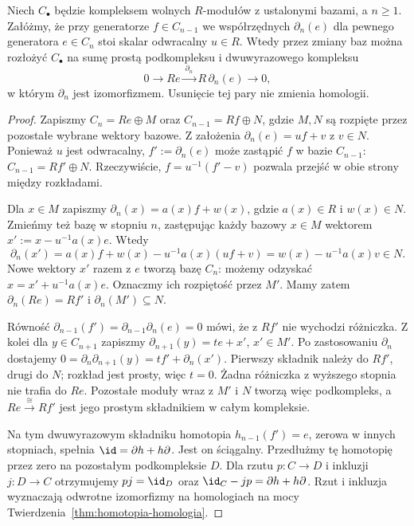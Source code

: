 \begin{twierdzenie}
\label{thm:kasowanie-pary}
Niech $C_\bullet$ będzie kompleksem
wolnych $R$-modułów z ustalonymi
bazami, a $n\geq1$. Załóżmy, że
przy generatorze $f\in C_{n-1}$
we współrzędnych $\partial_n(e)$ dla pewnego
generatora $e\in C_n$ stoi skalar
odwracalny $u\in R$.
Wtedy przez zmiany baz można rozłożyć
$C_\bullet$ na sumę prostą
podkompleksu i dwuwyrazowego kompleksu
\[
 0\longrightarrow R e
 \xrightarrow{\ \partial_n\ }R\,\partial_n(e)
 \longrightarrow0,
\]
w którym $\partial_n$ jest izomorfizmem.
Usunięcie tej pary nie zmienia homologii.
\end{twierdzenie}
\begin{proof}
Zapiszmy
$C_n=R e\oplus M$ oraz
$C_{n-1}=R f\oplus N$, gdzie
$M,N$ są rozpięte przez pozostałe
wybrane wektory bazowe.
Z założenia
$\partial_n(e)=u f+v$ z $v\in N$.
Ponieważ $u$ jest odwracalny,
$f':=\partial_n(e)$ może zastąpić $f$
w bazie $C_{n-1}$:
$C_{n-1}=R f'\oplus N$.
Rzeczywiście, $f=u^{-1}(f'-v)$
pozwala przejść w obie strony
między rozkładami.

Dla $x\in M$ zapiszmy
$\partial_n(x)=a(x)f+w(x)$,
gdzie $a(x)\in R$ i $w(x)\in N$.
Zmieńmy też bazę w stopniu $n$,
zastępując każdy bazowy $x\in M$
wektorem $x':=x-u^{-1}a(x)e$.
Wtedy
\[
 \partial_n(x')
 =a(x)f+w(x)-u^{-1}a(x)(uf+v)
 =w(x)-u^{-1}a(x)v\in N.
\]
Nowe wektory $x'$ razem z $e$
tworzą bazę $C_n$: możemy odzyskać
$x=x'+u^{-1}a(x)e$.
Oznaczmy ich rozpiętość przez $M'$.
Mamy zatem $\partial_n(Re)=Rf'$
i $\partial_n(M')\subseteq N$.

Równość $\partial_{n-1}(f')=\partial_{n-1}\partial_n(e)=0$
mówi, że z $Rf'$ nie wychodzi
różniczka. Z kolei dla $y\in C_{n+1}$
zapiszmy $\partial_{n+1}(y)=t e+x'$,
$x'\in M'$. Po zastosowaniu $\partial_n$
dostajemy
$0=\partial_n\partial_{n+1}(y)=t f'+\partial_n(x')$.
Pierwszy składnik należy do $Rf'$,
drugi do $N$; rozkład jest prosty,
więc $t=0$. Żadna różniczka
z wyższego stopnia nie trafia do $Re$.
Pozostałe moduły wraz z $M'$ i $N$
tworzą więc podkompleks, a
$Re\xrightarrow{\cong}Rf'$
jest jego prostym składnikiem
w całym kompleksie.

Na tym dwuwyrazowym składniku
homotopia $h_{n-1}(f')=e$,
zerowa w innych stopniach,
spełnia $\id=\partial h+h\partial$.
Jest on ściągalny. Przedłużmy tę homotopię przez zero na
pozostałym podkompleksie $D$. Dla rzutu $p:C\to D$ i inkluzji
$j:D\to C$ otrzymujemy $pj=\id_D$ oraz
$\id_C-jp=\partial h+h\partial$. Rzut i inkluzja
wyznaczają odwrotne izomorfizmy
na homologiach na mocy
Twierdzenia~\ref{thm:homotopia-homologia}.
\end{proof}

